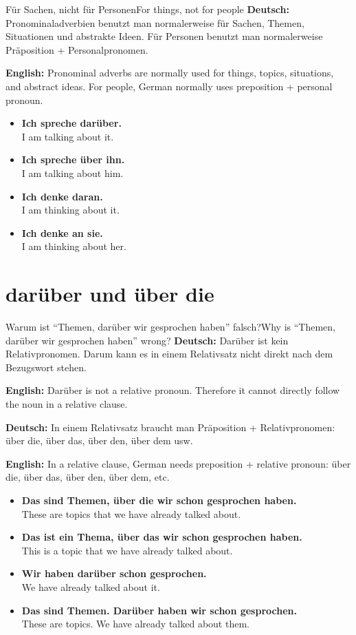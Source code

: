 \documentclass[a4paper,11pt]{article}
\newcommand{\GermanText}[1]{\textbf{Deutsch: }#1\par}
\newcommand{\EnglishText}[1]{{\small\color{SoftGray}\textbf{English: }#1\par}}
\newcommand{\ExampleItem}[2]{\item \textbf{#1}\\{\small\color{SoftGray}#2}}
\begin{document}
        \begin{grammarentry}{Für Sachen, nicht für Personen}{For things, not for people}
            \GermanText{Pronominaladverbien benutzt man normalerweise für Sachen, Themen, Situationen und abstrakte Ideen. Für Personen benutzt man normalerweise Präposition + Personalpronomen.}
            \EnglishText{Pronominal adverbs are normally used for things, topics, situations, and abstract ideas. For people, German normally uses preposition + personal pronoun.}
            
            \begin{exbox}
                \begin{itemize}
                    \ExampleItem{Ich spreche darüber.}{I am talking about it.}
                    \ExampleItem{Ich spreche über ihn.}{I am talking about him.}
                    \ExampleItem{Ich denke daran.}{I am thinking about it.}
                    \ExampleItem{Ich denke an sie.}{I am thinking about her.}
                \end{itemize}
            \end{exbox}
        \end{grammarentry}
    
    
    \section{darüber und über die}
        
        \begin{grammarentry}{Warum ist ``Themen, darüber wir gesprochen haben'' falsch?}{Why is ``Themen, darüber wir gesprochen haben'' wrong?}
            \GermanText{Darüber ist kein Relativpronomen. Darum kann es in einem Relativsatz nicht direkt nach dem Bezugswort stehen.}
            \EnglishText{Darüber is not a relative pronoun. Therefore it cannot directly follow the noun in a relative clause.}
            
            \GermanText{In einem Relativsatz braucht man Präposition + Relativpronomen: über die, über das, über den, über dem usw.}
            \EnglishText{In a relative clause, German needs preposition + relative pronoun: über die, über das, über den, über dem, etc.}
            
            \begin{exbox}
                \begin{itemize}
                    \ExampleItem{Das sind Themen, über die wir schon gesprochen haben.}{These are topics that we have already talked about.}
                    \ExampleItem{Das ist ein Thema, über das wir schon gesprochen haben.}{This is a topic that we have already talked about.}
                    \ExampleItem{Wir haben darüber schon gesprochen.}{We have already talked about it.}
                    \ExampleItem{Das sind Themen. Darüber haben wir schon gesprochen.}{These are topics. We have already talked about them.}
                \end{itemize}
            \end{exbox}
        \end{grammarentry}
    
\end{document}

